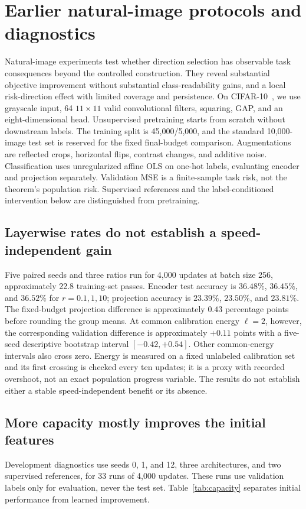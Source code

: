 \section{Earlier natural-image protocols and diagnostics}
\label{app:natural-details}
Natural-image experiments test whether direction selection has observable task consequences beyond the controlled construction. They reveal substantial objective improvement without substantial class-readability gains, and a local risk-direction effect with limited coverage and persistence. On CIFAR-10~\cite{krizhevsky2009learning}, we use grayscale input, 64 $11\times11$ valid convolutional filters, squaring, GAP, and an eight-dimensional head. Unsupervised pretraining starts from scratch without downstream labels. The training split is 45,000/5,000, and the standard 10,000-image test set is reserved for the fixed final-budget comparison. Augmentations are reflected crops, horizontal flips, contrast changes, and additive noise. Classification uses unregularized affine OLS on one-hot labels, evaluating encoder and projection separately. Validation MSE is a finite-sample task risk, not the theorem's population risk. Supervised references and the label-conditioned intervention below are distinguished from pretraining.

\subsection{Layerwise rates do not establish a speed-independent gain}
Five paired seeds and three ratios run for 4,000 updates at batch size 256, approximately 22.8 training-set passes. Encoder test accuracy is $36.48\%$, $36.45\%$, and $36.52\%$ for $r=0.1,1,10$; projection accuracy is $23.39\%$, $23.50\%$, and $23.81\%$. The fixed-budget projection difference is approximately $0.43$ percentage points before rounding the group means. At common calibration energy $\ell=2$, however, the corresponding validation difference is approximately $+0.11$ points with a five-seed descriptive bootstrap interval $[-0.42,+0.54]$. Other common-energy intervals also cross zero. Energy is measured on a fixed unlabeled calibration set and its first crossing is checked every ten updates; it is a proxy with recorded overshoot, not an exact population progress variable. The results do not establish either a stable speed-independent benefit or its absence.

\subsection{More capacity mostly improves the initial features}
Development diagnostics use seeds 0, 1, and 12, three architectures, and two supervised references, for 33 runs of 4,000 updates. These runs use validation labels only for evaluation, never the test set. Table~\ref{tab:capacity} separates initial performance from learned improvement.

